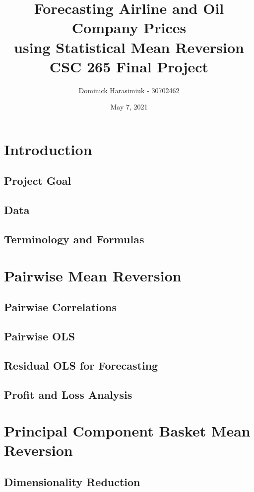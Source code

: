 \documentclass{article}
\title{Forecasting Airline and Oil Company Prices \\
using Statistical Mean Reversion \\
\large CSC 265 Final Project}
\author{Dominick Harasimiuk - 30702462}
\date{May 7, 2021}
\begin{document}
\maketitle

\vspace{1cm}

\begin{abstract}
\noindent
\lipsum[1]
\end{abstract}

\newpage
\section{Introduction}
\subsection{Project Goal}
\subsection{Data}
\subsection{Terminology and Formulas}

\section{Pairwise Mean Reversion}
\subsection{Pairwise Correlations}
\subsection{Pairwise OLS}
\subsection{Residual OLS for Forecasting}
\subsection{Profit and Loss Analysis}

\section{Principal Component Basket Mean Reversion}
\subsection{Dimensionality Reduction}
\end{document}
